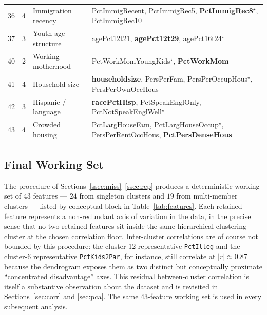 \documentclass{ieeeaccess}
\begin{document}
\begin{table}[!t]
\begin{tabular}{cclp{8.0cm}}
36 &  4 & Immigration recency      & PctImmigRecent, PctImmigRec5, \textbf{PctImmigRec8}$^\star$, PctImmigRec10 \\
37 &  3 & Youth age structure      & agePct12t21, \textbf{agePct12t29}, agePct16t24$^\star$ \\
40 &  2 & Working motherhood       & PctWorkMomYoungKids$^\star$, \textbf{PctWorkMom} \\
41 &  4 & Household size           & \textbf{householdsize}, PersPerFam, PersPerOccupHous$^\star$, PersPerOwnOccHous \\
42 &  3 & Hispanic / language      & \textbf{racePctHisp}, PctSpeakEnglOnly, PctNotSpeakEnglWell$^\star$ \\
43 &  4 & Crowded housing          & PctLargHouseFam, PctLargHouseOccup$^\star$, PersPerRentOccHous, \textbf{PctPersDenseHous} \\
\bottomrule
\end{tabular}
\end{table}

\subsection{Final Working Set}
\label{ssec:final}
The procedure of Sections~\ref{ssec:miss}--\ref{ssec:rep} produces a deterministic working set of $43$ features --- $24$ from singleton clusters and $19$ from multi-member clusters --- listed by conceptual block in Table~\ref{tab:features}. Each retained feature represents a non-redundant axis of variation in the data, in the precise sense that no two retained features sit inside the same hierarchical-clustering cluster at the chosen correlation floor. Inter-cluster correlations are of course not bounded by this procedure: the cluster-12 representative \texttt{PctIlleg} and the cluster-6 representative \texttt{PctKids2Par}, for instance, still correlate at $|r|\approx 0.87$ because the dendrogram exposes them as two distinct but conceptually proximate ``concentrated disadvantage'' axes. This residual between-cluster correlation is itself a substantive observation about the dataset and is revisited in Sections~\ref{sec:corr} and \ref{sec:pca}. The same $43$-feature working set is used in every subsequent analysis.
\end{document}
